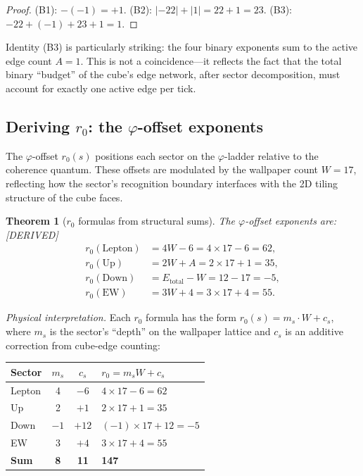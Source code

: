 \documentclass[11pt,a4paper]{article}
\newtheorem{theorem}{Theorem}[section]
\theoremstyle{definition}
\theoremstyle{remark}
\newcommand{\phig}{\varphi}
\newcommand{\Etot}{E_{\mathrm{total}}}
\newcommand{\DERIVED}{\textcolor{blue!70!black}{\footnotesize\textsf{[DERIVED]}}}
\begin{document}
\begin{proof}
(B1): $-(-1) = +1$.\;
(B2): $|-22| + |1| = 22 + 1 = 23$.\;
(B3): $-22 + (-1) + 23 + 1 = 1$.
\end{proof}

\noindent
Identity (B3) is particularly striking: the four binary exponents sum to the
active edge count $A = 1$.  This is not a coincidence---it reflects the fact
that the total binary ``budget'' of the cube's edge network, after sector
decomposition, must account for exactly one active edge per tick.

\subsection{Deriving $r_0$: the $\phig$-offset exponents}

The $\phig$-offset $r_0(s)$ positions each sector on the $\phig$-ladder
relative to the coherence quantum.  These offsets are modulated by the
wallpaper count $W = 17$, reflecting how the sector's recognition boundary
interfaces with the 2D tiling structure of the cube faces.

\begin{theorem}[$r_0$ formulas from structural sums]
\label{thm:r0}
The $\phig$-offset exponents are: \DERIVED{}
\begin{equation}
\begin{aligned}
  r_0(\text{Lepton})  &= 4W - 6 = 4 \times 17 - 6 = 62, \\
  r_0(\text{Up})      &= 2W + A = 2 \times 17 + 1 = 35, \\
  r_0(\text{Down})    &= \Etot - W = 12 - 17 = -5, \\
  r_0(\text{EW})      &= 3W + 4 = 3 \times 17 + 4 = 55.
\end{aligned}
\label{eq:r0}
\end{equation}
\end{theorem}

\noindent\textit{Physical interpretation.}\quad
Each $r_0$ formula has the form $r_0(s) = m_s \cdot W + c_s$, where $m_s$ is
the sector's ``depth'' on the wallpaper lattice and $c_s$ is an additive
correction from cube-edge counting:

\begin{center}
\begin{tabular}{lccl}
\toprule
Sector & $m_s$ & $c_s$ & $r_0 = m_s W + c_s$ \\
\midrule
Lepton & 4 & $-6$ & $4 \times 17 - 6 = 62$ \\
Up     & 2 & $+1$ & $2 \times 17 + 1 = 35$ \\
Down   & $-1$ & $+12$ & $(-1) \times 17 + 12 = -5$ \\
EW     & 3 & $+4$ & $3 \times 17 + 4 = 55$ \\
\midrule
\textbf{Sum} & \textbf{8} & \textbf{11} & \textbf{147} \\
\bottomrule
\end{tabular}
\end{center}
\end{document}
